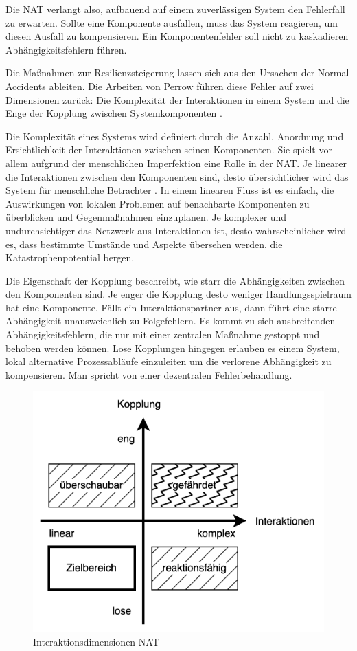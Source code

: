 \documentclass[]{lni}
\begin{document}
Die NAT verlangt also, aufbauend auf einem zuverlässigen System den Fehlerfall zu erwarten. Sollte eine Komponente ausfallen, muss das System reagieren, um diesen Ausfall zu kompensieren. Ein Komponentenfehler soll nicht zu kaskadieren Abhängigkeitsfehlern führen.

Die Maßnahmen zur Resilienzsteigerung lassen sich aus den Ursachen der \glqq Normal Accidents\grqq{} ableiten. Die Arbeiten von Perrow führen diese Fehler auf zwei Dimensionen zurück: Die Komplexität der Interaktionen in einem System und die Enge der Kopplung zwischen Systemkomponenten \cite{Perrow.2004}.

Die Komplexität eines Systems wird definiert durch die Anzahl, Anordnung und Ersichtlichkeit der Interaktionen zwischen seinen Komponenten. Sie spielt vor allem aufgrund der menschlichen Imperfektion eine Rolle in der NAT. Je linearer die Interaktionen zwischen den Komponenten sind, desto übersichtlicher wird das System für menschliche Betrachter \cite[72]{CharlesPerrow.2000}. In einem linearen Fluss ist es einfach, die Auswirkungen von lokalen Problemen auf benachbarte Komponenten zu überblicken und Gegenmaßnahmen einzuplanen. Je komplexer und undurchsichtiger das Netzwerk aus Interaktionen ist, desto wahrscheinlicher wird es, dass bestimmte Umstände und Aspekte übersehen werden, die Katastrophenpotential bergen.

Die Eigenschaft der Kopplung beschreibt, wie starr die Abhängigkeiten zwischen den Komponenten sind. Je enger die Kopplung desto weniger Handlungsspielraum hat eine Komponente. Fällt ein Interaktionspartner aus, dann führt eine starre Abhängigkeit unausweichlich zu Folgefehlern. Es kommt zu sich ausbreitenden Abhängigkeitsfehlern, die nur mit einer zentralen Maßnahme gestoppt und behoben werden können. Lose Kopplungen hingegen erlauben es einem System, lokal alternative Prozessabläufe einzuleiten um die verlorene Abhängigkeit zu kompensieren. Man spricht von einer dezentralen Fehlerbehandlung. \cite[101]{ThierryMeyer.2022}



\begin{figure}[ht]
    \centering
    \hspace{1.7cm}
    \includegraphics[width=.6\textwidth]{images/NatDimensions.drawio.png}
    \caption{Interaktionsdimensionen NAT}
    \label{fig:NatDimensions}
\end{figure}
\end{document}
